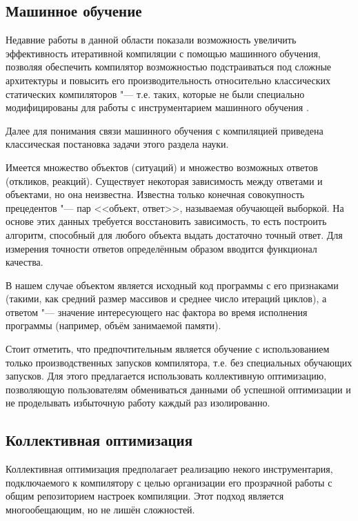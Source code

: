\subsection{Машинное обучение}
Недавние работы в данной области показали возможность увеличить эффективность итеративной компиляции с помощью машинного обучения, позволяя обеспечить компилятор возможностью подстраиваться под сложные архитектуры и повысить его производительность относительно классических статических компиляторов "--- т.е. таких, которые не были специально модифицированы для работы с инструментарием машинного обучения \cite{Dubach:2009:PCO:1669112.1669124,Dubach:2008:EPA:1450095.1450103}.

Далее для понимания связи машинного обучения с компиляцией приведена классическая постановка задачи этого раздела науки.

Имеется множество объектов (ситуаций) и множество возможных ответов (откликов, реакций). Существует некоторая зависимость между ответами и объектами, но она неизвестна. Известна только конечная совокупность прецедентов "--- пар <<объект, ответ>>, называемая обучающей выборкой. На основе этих данных требуется восстановить зависимость, то есть построить алгоритм, способный для любого объекта выдать достаточно точный ответ. Для измерения точности ответов определённым образом вводится функционал качества.

В нашем случае объектом является исходный код программы с его признаками (такими, как средний размер массивов и среднее число итераций циклов), а ответом "--- значение интересующего нас фактора во время исполнения программы (например, объём занимаемой памяти).

Стоит отметить, что предпочтительным является обучение с использованием только производственных запусков компилятора, т.е. без специальных обучающих запусков. Для этого предлагается использовать коллективную оптимизацию, позволяющую пользователям обмениваться данными об успешной оптимизации и не проделывать избыточную работу каждый раз изолированно.


\subsection{Коллективная оптимизация}
Коллективная оптимизация предполагает реализацию некого инструментария, подключаемого к компилятору с целью организации его прозрачной работы с общим репозиторием настроек компиляции. Этот подход является многообещающим, но не лишён сложностей.


